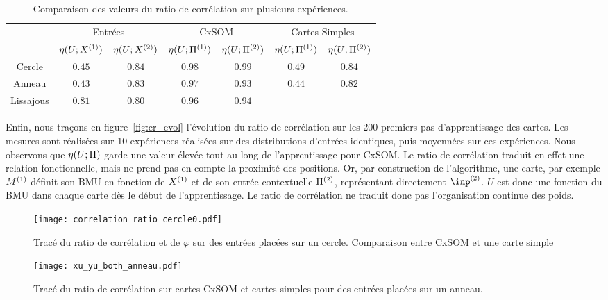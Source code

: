 \documentclass[../main]{subfiles}
\begin{document}
\begin{table}
    \centering
    \caption{Comparaison des valeurs du ratio de corrélation sur plusieurs expériences.\label{tab:eta}}
    \begin{tabular}{*7c}
        \toprule
        & \multicolumn{2}{c}{Entrées} & \multicolumn{2}{c}{CxSOM} & \multicolumn{2}{c}{Cartes Simples} \\
        \cmidrule(lr){2-7}
         & $\eta(U;X^{({1})})$ & $\eta(U;X^{({2})})$  & $\eta(U;\Pi^{({1})})$ & $\eta(U;\Pi^{({2})})$  & $\eta(U;\Pi^{({1})})$ & $\eta(U;\Pi^{({2})})$ \\    
        \midrule
        Cercle &   $0.45 $    & $0.84$  &  $0.98$ & $0.99$ & $0.49$ & $0.84$      \\
        Anneau &  $0.43$      &  $0.83$      & $0.97$ & $0.93$ & $0.44$ & $0.82$ \\
        Lissajous &  $0.81$     &  $0.80$ & $0.96$ & $0.94$  & & \\
        \bottomrule
    \end{tabular}
\end{table}

Enfin, nous traçons en figure~\ref{fig:cr_evol} l'évolution du ratio de corrélation sur les 200 premiers pas d'apprentissage des cartes. 
Les mesures sont réalisées sur 10 expériences réalisées sur des distributions d'entrées identiques, puis moyennées sur ces expériences.
Nous observons que $\eta(U;\Pi)$ garde une valeur élevée tout au long de l'apprentissage pour CxSOM.
Le ratio de corrélation traduit en effet une relation fonctionnelle, mais ne prend pas en compte la proximité des positions. 
Or, par construction de l'algorithme, une carte, par exemple $M^{({1})}$ définit son BMU en fonction de $X^{({1})}$ et de son entrée contextuelle $\Pi^{({2})}$, représentant directement $\inp\m{2}$. $U$ est donc une fonction du BMU dans chaque carte dès le début de l'apprentissage. Le ratio de corrélation ne traduit donc pas l'organisation continue des poids.

\begin{figure}
    \centering\texttt{[image: correlation\_ratio\_cercle0.pdf]}
    \caption{Tracé du ratio de corrélation et de $\varphi$ sur des entrées placées sur un cercle. Comparaison entre CxSOM et une carte simple \label{fig:cr_xp}}
\end{figure}

\begin{figure}
   \centering \texttt{[image: xu\_yu\_both\_anneau.pdf]}
    \caption{Tracé du ratio de corrélation sur cartes CxSOM et cartes simples pour des entrées placées sur un anneau.\label{fig:cr_bruit}}
\end{figure}
\end{document}
